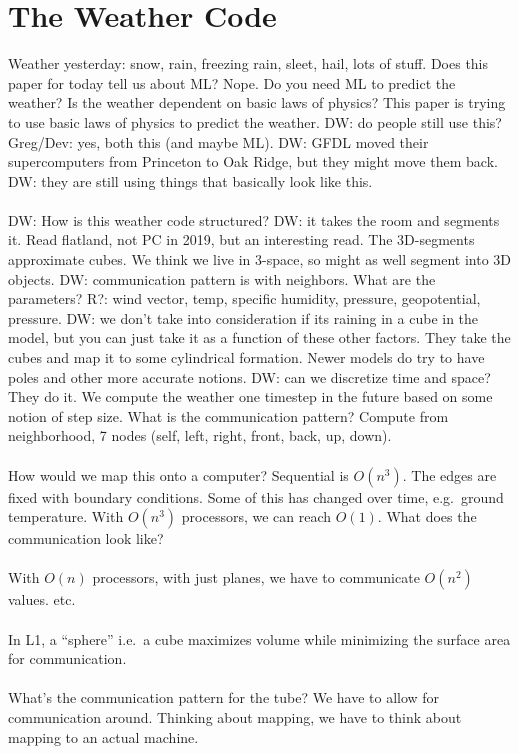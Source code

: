 \section{The Weather Code}
Weather yesterday: snow, rain, freezing rain, sleet, hail, lots of stuff.
Does this paper for today tell us about ML? Nope.
Do you need ML to predict the weather?
Is the weather dependent on basic laws of physics?
This paper is trying to use basic laws of physics to predict the weather.
DW: do people still use this?
Greg/Dev: yes, both this (and maybe ML).
DW: GFDL moved their supercomputers from Princeton to Oak Ridge, but they might move them back.
DW: they are still using things that basically look like this.
\\ \\
DW: How is this weather code structured?
DW: it takes the room and segments it.
Read flatland, not PC in 2019, but an interesting read.
The 3D-segments approximate cubes.
We think we live in 3-space, so might as well segment into 3D objects.
DW: communication pattern is with neighbors.
What are the parameters?
R?: wind vector, temp, specific humidity, pressure, geopotential, pressure.
DW: we don't take into consideration if its raining in a cube in the model, but you can just take it as a function of these other factors.
They take the cubes and map it to some cylindrical formation.
Newer models do try to have poles and other more accurate notions.
DW: can we discretize time and space?
They do it.
We compute the weather one timestep in the future based on some notion of step size.
What is the communication pattern?
Compute from neighborhood, 7 nodes (self, left, right, front, back, up, down).
\\ \\
How would we map this onto a computer?
Sequential is \( O(n^3) \).
The edges are fixed with boundary conditions.
Some of this has changed over time, e.g.\ ground temperature.
With \( O(n^3) \) processors, we can reach \( O(1) \).
What does the communication look like?
\\ \\
With \( O(n) \) processors, with just planes, we have to communicate \( O(n^2) \) values.
etc.
\\ \\
In L1, a ``sphere'' i.e.\ a cube maximizes volume while minimizing the surface area for communication.
\\ \\
What's the communication pattern for the tube?
We have to allow for communication around.
Thinking about mapping, we have to think about mapping to an actual machine.

